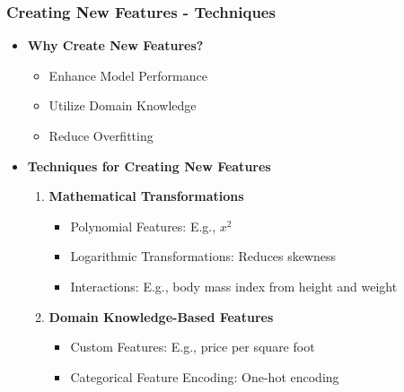 \documentclass[aspectratio=169]{beamer}
\begin{document}
\begin{frame}[fragile]
    \frametitle{Creating New Features - Techniques}
    \begin{itemize}
        \item \textbf{Why Create New Features?}
        \begin{itemize}
            \item Enhance Model Performance
            \item Utilize Domain Knowledge
            \item Reduce Overfitting
        \end{itemize}
        
        \item \textbf{Techniques for Creating New Features}
        \begin{enumerate}
            \item \textbf{Mathematical Transformations}
            \begin{itemize}
                \item Polynomial Features: E.g., \(x^2\)
                \item Logarithmic Transformations: Reduces skewness
                \item Interactions: E.g., body mass index from height and weight
            \end{itemize}
            \item \textbf{Domain Knowledge-Based Features}
            \begin{itemize}
                \item Custom Features: E.g., price per square foot
                \item Categorical Feature Encoding: One-hot encoding
            \end{itemize}
        \end{enumerate}
    \end{itemize}
\end{frame}
\end{document}
